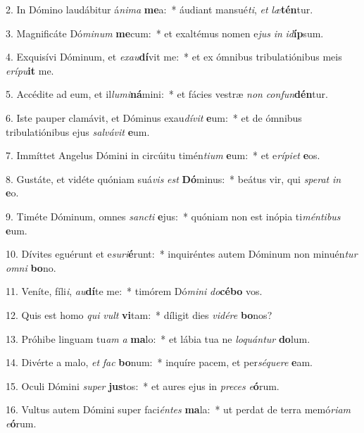 2. In Dómino laudábitur á\textit{ni}\textit{ma} \textbf{me}a:~*  áudiant mansué\textit{ti}, \textit{et} \textit{læ}\textbf{tén}tur.\

3. Magnificáte Dó\textit{mi}\textit{num} \textbf{me}cum:~*  et exaltémus nomen e\textit{jus} \textit{in} \textit{id}\textbf{íp}sum.\

4. Exquisívi Dóminum, et \textit{ex}\textit{au}\textbf{dí}vit me:~*  et ex ómnibus tribulatiónibus meis \textit{e}\textit{rí}\textit{pu}\textbf{it} me.\

5. Accédite ad eum, et il\textit{lu}\textit{mi}\textbf{ná}mini:~*  et fácies vestræ \textit{non} \textit{con}\textit{fun}\textbf{dén}tur.\

6. Iste pauper clamávit, et Dóminus exau\textit{dí}\textit{vit} \textbf{e}um:~*  et de ómnibus tribulatiónibus ejus \textit{sal}\textit{vá}\textit{vit} \textbf{e}um.\

7. Immíttet Angelus Dómini in circúitu timén\textit{ti}\textit{um} \textbf{e}um:~*  et e\textit{rí}\textit{pi}\textit{et} \textbf{e}os.\

8. Gustáte, et vidéte quóniam suá\textit{vis} \textit{est} \textbf{Dó}minus:~*  beátus vir, qui \textit{spe}\textit{rat} \textit{in} \textbf{e}o.\

9. Timéte Dóminum, omnes \textit{sanc}\textit{ti} \textbf{e}jus:~*  quóniam non est inópia ti\textit{mén}\textit{ti}\textit{bus} \textbf{e}um.\

10. Dívites eguérunt et e\textit{su}\textit{ri}\textbf{é}runt:~*  inquiréntes autem Dóminum non minuén\textit{tur} \textit{om}\textit{ni} \textbf{bo}no.\

11. Veníte, fíli\textit{i}, \textit{au}\textbf{dí}te me:~*  timórem Dó\textit{mi}\textit{ni} \textit{do}\textbf{cé}\textbf{bo} vos.\

12. Quis est homo \textit{qui} \textit{vult} \textbf{vi}tam:~*  díligit dies \textit{vi}\textit{dé}\textit{re} \textbf{bo}nos?\

13. Próhibe linguam tu\textit{am} \textit{a} \textbf{ma}lo:~*  et lábia tua ne \textit{lo}\textit{quán}\textit{tur} \textbf{do}lum.\

14. Divérte a malo, \textit{et} \textit{fac} \textbf{bo}num:~*  inquíre pacem, et per\textit{sé}\textit{que}\textit{re} \textbf{e}am.\

15. Oculi Dómini \textit{su}\textit{per} \textbf{jus}tos:~*  et aures ejus in \textit{pre}\textit{ces} \textit{e}\textbf{ó}rum.\

16. Vultus autem Dómini super faci\textit{én}\textit{tes} \textbf{ma}la:~*  ut perdat de terra memó\textit{ri}\textit{am} \textit{e}\textbf{ó}rum.\

